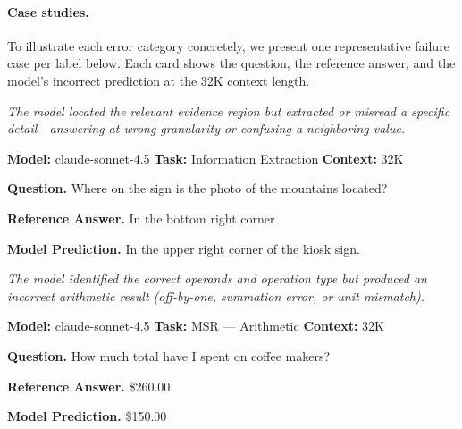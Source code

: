 \documentclass{llmxive}
\begin{document}
\paragraph{Case studies.}
To illustrate each error category concretely, we present one representative failure case per label below. Each card shows the question, the reference answer, and the model's incorrect prediction at the 32K context length.

\vspace{0.5em}

\begin{tcolorbox}[
  title={Case Study: Grounding Failure},
  enhanced, sharp corners,
  colback=gray!3, colframe=black!40,
  boxrule=0.4pt, fonttitle=\bfseries,
  left=4pt, right=4pt, top=3pt, bottom=3pt
]
\footnotesize

\textit{The model located the relevant evidence region but extracted or misread a specific detail---answering at wrong granularity or confusing a neighboring value.}
\vspace{0.4em}

\textbf{Model:} claude-sonnet-4.5 \hfill \textbf{Task:} Information Extraction \hfill \textbf{Context:} 32K
\vspace{0.3em}

\textbf{Question.} Where on the sign is the photo of the mountains located?
\vspace{0.3em}

\textbf{Reference Answer.} In the bottom right corner

\textbf{Model Prediction.} In the upper right corner of the kiosk sign.

\end{tcolorbox}

\begin{tcolorbox}[
  title={Case Study: Computation Slip},
  enhanced, sharp corners,
  colback=gray!3, colframe=black!40,
  boxrule=0.4pt, fonttitle=\bfseries,
  left=4pt, right=4pt, top=3pt, bottom=3pt
]
\footnotesize

\textit{The model identified the correct operands and operation type but produced an incorrect arithmetic result (off-by-one, summation error, or unit mismatch).}
\vspace{0.4em}

\textbf{Model:} claude-sonnet-4.5 \hfill \textbf{Task:} MSR --- Arithmetic \hfill \textbf{Context:} 32K
\vspace{0.3em}

\textbf{Question.} How much total have I spent on coffee makers?
\vspace{0.3em}

\textbf{Reference Answer.} \$260.00

\textbf{Model Prediction.} \$150.00

\end{tcolorbox}
\end{document}
